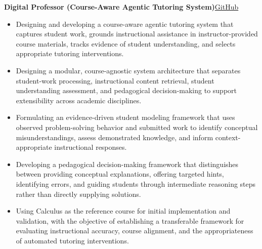 \documentclass[11pt]{article}
\newcommand{\projectentry}[2]{%
  \Needspace{8\baselineskip}%
  \textbf{#1}\hfill #2\\[-8pt]%
}
\newenvironment{tightitemize}{%
  \vspace{-2pt}%
  \begin{itemize}[leftmargin=*,topsep=0pt,itemsep=1pt,parsep=0pt,partopsep=0pt]
}{%
  \end{itemize}\vspace{4pt}
}
\begin{document}
\projectentry
{Digital Professor (Course-Aware Agentic Tutoring System)}
{\href{https://github.com/digital-professor-lab/digital-professor}{GitHub}}
\begin{tightitemize}
\item Designing and developing a course-aware agentic tutoring system that captures student work, grounds instructional assistance in instructor-provided course materials, tracks evidence of student understanding, and selects appropriate tutoring interventions.
\item Designing a modular, course-agnostic system architecture that separates student-work processing, instructional content retrieval, student understanding assessment, and pedagogical decision-making to support extensibility across academic disciplines.
\item Formulating an evidence-driven student modeling framework that uses observed problem-solving behavior and submitted work to identify conceptual misunderstandings, assess demonstrated knowledge, and inform context-appropriate instructional responses.
\item Developing a pedagogical decision-making framework that distinguishes between providing conceptual explanations, offering targeted hints, identifying errors, and guiding students through intermediate reasoning steps rather than directly supplying solutions.
\item Using Calculus as the reference course for initial implementation and validation, with the objective of establishing a transferable framework for evaluating instructional accuracy, course alignment, and the appropriateness of automated tutoring interventions.
\end{tightitemize}
\end{document}
